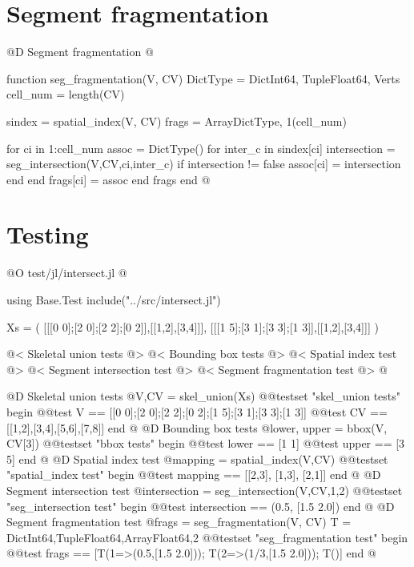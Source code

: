 \documentclass[10pt,oneside]{article}
\begin{document}
\section{Segment fragmentation}
@D Segment fragmentation
@{function seg_fragmentation(V, CV)
    DictType = Dict{Int64, Tuple{Float64, Verts}}
    cell_num = length(CV)

    sindex = spatial_index(V, CV)
    frags = Array{DictType, 1}(cell_num)

    for ci in 1:cell_num
        assoc = DictType()
        for inter_c in sindex[ci]
            intersection = seg_intersection(V,CV,ci,inter_c)
            if intersection != false
                assoc[ci] = intersection
            end
        end
        frags[ci] = assoc
    end
    frags
end
@}

\section{Testing}
@O test/jl/intersect.jl
@{using Base.Test
include("../src/intersect.jl")

Xs = (
    [[[0 0];[2 0];[2 2];[0 2]],[[1,2],[3,4]]],
    [[[1 5];[3 1];[3 3];[1 3]],[[1,2],[3,4]]]
)

@< Skeletal union tests @>
@< Bounding box tests @>
@< Spatial index test @>
@< Segment intersection test @>
@< Segment fragmentation test @>
@}
@D Skeletal union tests
@{V,CV = skel_union(Xs)
@@testset "skel_union tests" begin
    @@test V == [[0 0];[2 0];[2 2];[0 2];[1 5];[3 1];[3 3];[1 3]]
    @@test CV == [[1,2],[3,4],[5,6],[7,8]]
end
@}
@D Bounding box tests
@{lower, upper = bbox(V, CV[3])
@@testset "bbox tests" begin
    @@test lower == [1 1]
    @@test upper == [3 5]
end
@}
@D Spatial index test
@{mapping = spatial_index(V,CV)
@@testset "spatial_index test" begin
    @@test mapping == [[2,3], [1,3], [2,1]]
end
@}
@D Segment intersection test
@{intersection = seg_intersection(V,CV,1,2)
@@testset "seg_intersection test" begin
    @@test intersection == (0.5, [1.5 2.0])
end
@}
@D Segment fragmentation test
@{frags = seg_fragmentation(V, CV)
T = Dict{Int64,Tuple{Float64,Array{Float64,2}}}
@@testset "seg_fragmentation test" begin
    @@test frags == [T(1=>(0.5,[1.5 2.0])); T(2=>(1/3,[1.5 2.0])); T()]
end
@}
\end{document}
